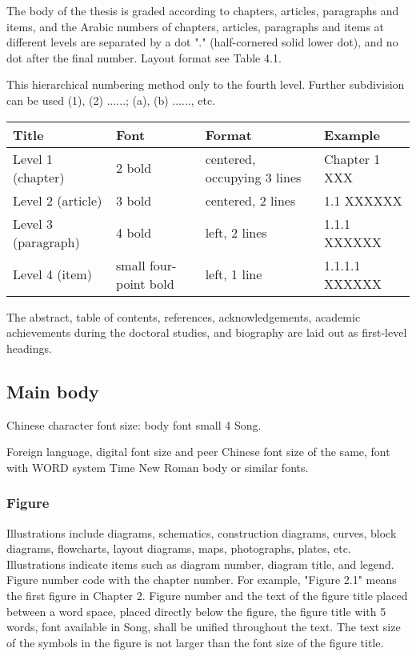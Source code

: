 The body of the thesis is graded according to chapters, articles, paragraphs and items, and the Arabic numbers of chapters, articles, paragraphs and items at different levels are separated by a dot "." (half-cornered solid lower dot), and no dot after the final number. Layout format see Table 4.1.

This hierarchical numbering method only to the fourth level. Further subdivision can be used (1), (2) ......; (a), (b) ......, etc.

\begin{table}[htpb]
    \begin{center}
        \begin{tabular}{|l | l | l | l |}
            \hline
            Title       & Font   & Format        & Example           \\
            \hline
            Level 1 (chapter) & 2 bold & centered, occupying 3 lines & Chapter 1 XXX \\
            \hline
            Level 2 (article) & 3 bold & centered, 2 lines & 1.1 XXXXXX \\
            \hline
            Level 3 (paragraph) & 4 bold & left, 2 lines & 1.1.1 XXXXXX \\
            \hline
            Level 4 (item) & small four-point bold & left, 1 line & 1.1.1.1 XXXXXX  \\
            \hline
        \end{tabular}
    \end{center}
\end{table}

The abstract, table of contents, references, acknowledgements, academic achievements during the doctoral studies, and biography are laid out as first-level headings.

\subsection{Main body}
Chinese character font size: body font small 4 Song.

Foreign language, digital font size and peer Chinese font size of the same, font with WORD system Time New Roman body or similar fonts.

\subsubsection{Figure}
Illustrations include diagrams, schematics, construction diagrams, curves, block diagrams, flowcharts, layout diagrams, maps, photographs, plates, etc. Illustrations indicate items such as diagram number, diagram title, and legend. Figure number code with the chapter number. For example, "Figure 2.1" means the first figure in Chapter 2. Figure number and the text of the figure title placed between a word space, placed directly below the figure, the figure title with 5 words, font available in Song, shall be unified throughout the text. The text size of the symbols in the figure is not larger than the font size of the figure title.

